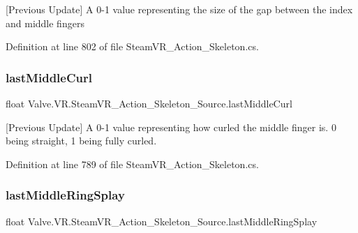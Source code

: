 \mbox{[}Previous Update\mbox{]} A 0-\/1 value representing the size of the gap between the index and middle fingers 



Definition at line 802 of file Steam\+V\+R\+\_\+\+Action\+\_\+\+Skeleton.\+cs.

\mbox{\label{class_valve_1_1_v_r_1_1_steam_v_r___action___skeleton___source_a734295b474070aae8e37011cbf6e4faa}} 
\subsubsection{\texorpdfstring{lastMiddleCurl}{lastMiddleCurl}}
{\footnotesize\ttfamily float Valve.\+V\+R.\+Steam\+V\+R\+\_\+\+Action\+\_\+\+Skeleton\+\_\+\+Source.\+last\+Middle\+Curl\hspace{0.3cm}{\ttfamily [get]}}



\mbox{[}Previous Update\mbox{]} A 0-\/1 value representing how curled the middle finger is. 0 being straight, 1 being fully curled. 



Definition at line 789 of file Steam\+V\+R\+\_\+\+Action\+\_\+\+Skeleton.\+cs.

\mbox{\label{class_valve_1_1_v_r_1_1_steam_v_r___action___skeleton___source_a44f2709c947cd957b45809768ab3f245}} 
\subsubsection{\texorpdfstring{lastMiddleRingSplay}{lastMiddleRingSplay}}
{\footnotesize\ttfamily float Valve.\+V\+R.\+Steam\+V\+R\+\_\+\+Action\+\_\+\+Skeleton\+\_\+\+Source.\+last\+Middle\+Ring\+Splay\hspace{0.3cm}{\ttfamily [get]}}



